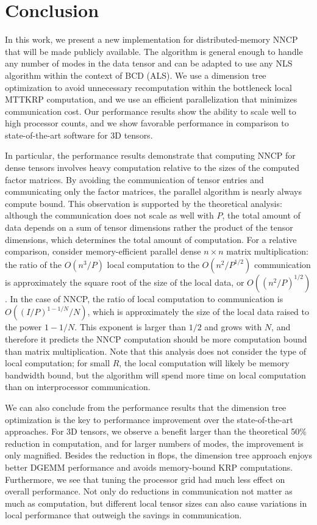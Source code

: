 
\section{Conclusion} \label{sec:conclusion}

In this work, we present a new implementation for distributed-memory NNCP that will be made publicly available.
The algorithm is general enough to handle any number of modes in the data tensor and can be adapted to use any NLS algorithm within the context of BCD (ALS).
We use a dimension tree optimization to avoid unnecessary recomputation within the bottleneck local MTTKRP computation, and we use an efficient parallelization that minimizes communication cost.
Our performance results show the ability to scale well to high processor counts, and we show favorable performance in comparison to state-of-the-art software for 3D tensors.

In particular, the performance results demonstrate that computing NNCP for dense tensors involves heavy computation relative to the sizes of the computed factor matrices.
By avoiding the communication of tensor entries and communicating only the factor matrices, the parallel algorithm is nearly always compute bound.
This observation is supported by the theoretical analysis: although the communication does not scale as well with $P$, the total amount of data depends on a sum of tensor dimensions rather the product of the tensor dimensions, which determines the total amount of computation.
For a relative comparison, consider memory-efficient parallel dense $n\times n$ matrix multiplication: the ratio of the $O(n^3/P)$ local computation to the $O(n^2/P^{1/2})$ communication is approximately the square root of the size of the local data, or $O((n^2/P)^{1/2})$.
In the case of NNCP, the ratio of local computation to communication is $O((I/P)^{1-1/N}/N)$, which is approximately the size of the local data raised to the power $1-1/N$.
This exponent is larger than $1/2$ and grows with $N$, and therefore it predicts the NNCP computation should be more computation bound than matrix multiplication.
Note that this analysis does not consider the type of local computation; for small $R$, the local computation will likely be memory bandwidth bound, but the algorithm will spend more time on local computation than on interprocessor communication.

We can also conclude from the performance results that the dimension tree optimization is the key to performance improvement over the state-of-the-art approaches.
For 3D tensors, we observe a benefit larger than the theoretical 50\% reduction in computation, and for larger numbers of modes, the improvement is only magnified.
Besides the reduction in flops, the dimension tree approach enjoys better DGEMM performance and avoids memory-bound KRP computations.
Furthermore, we see that tuning the processor grid had much less effect on overall performance.
Not only do reductions in communication not matter as much as computation, but different local tensor sizes can also cause variations in local performance that outweigh the savings in communication.

